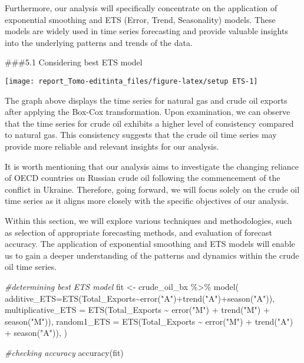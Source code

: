 \documentclass[
]{article}
\newenvironment{Shaded}{\begin{snugshade}}{\end{snugshade}}
\newcommand{\AttributeTok}[1]{\textcolor[rgb]{0.77,0.63,0.00}{#1}}
\newcommand{\CommentTok}[1]{\textcolor[rgb]{0.56,0.35,0.01}{\textit{#1}}}
\newcommand{\FunctionTok}[1]{\textcolor[rgb]{0.00,0.00,0.00}{#1}}
\newcommand{\NormalTok}[1]{#1}
\newcommand{\OtherTok}[1]{\textcolor[rgb]{0.56,0.35,0.01}{#1}}
\newcommand{\SpecialCharTok}[1]{\textcolor[rgb]{0.00,0.00,0.00}{#1}}
\newcommand{\StringTok}[1]{\textcolor[rgb]{0.31,0.60,0.02}{#1}}
\begin{document}
Furthermore, our analysis will specifically concentrate on the
application of exponential smoothing and ETS (Error, Trend, Seasonality)
models. These models are widely used in time series forecasting and
provide valuable insights into the underlying patterns and trends of the
data.

\#\#\#5.1 Considering best ETS model

\begin{center}\texttt{[image: report\_Tomo-editinta\_files/figure-latex/setup ETS-1]} \end{center}

The graph above displays the time series for natural gas and crude oil
exports after applying the Box-Cox transformation. Upon examination, we
can observe that the time series for crude oil exhibits a higher level
of consistency compared to natural gas. This consistency suggests that
the crude oil time series may provide more reliable and relevant
insights for our analysis.

It is worth mentioning that our analysis aims to investigate the
changing reliance of OECD countries on Russian crude oil following the
commencement of the conflict in Ukraine. Therefore, going forward, we
will focus solely on the crude oil time series as it aligns more closely
with the specific objectives of our analysis.

Within this section, we will explore various techniques and
methodologies, such as selection of appropriate forecasting methods, and
evaluation of forecast accuracy. The application of exponential
smoothing and ETS models will enable us to gain a deeper understanding
of the patterns and dynamics within the crude oil time series.

\begin{Shaded}
\begin{Highlighting}[]
\CommentTok{\#determining best ETS model}
\NormalTok{fit }\OtherTok{\textless{}{-}}\NormalTok{ crude\_oil\_bx }\SpecialCharTok{\%\textgreater{}\%} 
  \FunctionTok{model}\NormalTok{(}
    \AttributeTok{additive\_ETS=}\FunctionTok{ETS}\NormalTok{(Total\_Exports}\SpecialCharTok{\textasciitilde{}}\FunctionTok{error}\NormalTok{(}\StringTok{"A"}\NormalTok{)}\SpecialCharTok{+}\FunctionTok{trend}\NormalTok{(}\StringTok{"A"}\NormalTok{)}\SpecialCharTok{+}\FunctionTok{season}\NormalTok{(}\StringTok{"A"}\NormalTok{)),}
    \AttributeTok{multiplicative\_ETS =} \FunctionTok{ETS}\NormalTok{(Total\_Exports }\SpecialCharTok{\textasciitilde{}} \FunctionTok{error}\NormalTok{(}\StringTok{"M"}\NormalTok{) }\SpecialCharTok{+} \FunctionTok{trend}\NormalTok{(}\StringTok{"M"}\NormalTok{) }\SpecialCharTok{+} \FunctionTok{season}\NormalTok{(}\StringTok{"M"}\NormalTok{)),}
    \AttributeTok{random1\_ETS =} \FunctionTok{ETS}\NormalTok{(Total\_Exports }\SpecialCharTok{\textasciitilde{}} \FunctionTok{error}\NormalTok{(}\StringTok{"M"}\NormalTok{) }\SpecialCharTok{+} \FunctionTok{trend}\NormalTok{(}\StringTok{"A"}\NormalTok{) }\SpecialCharTok{+} \FunctionTok{season}\NormalTok{(}\StringTok{"A"}\NormalTok{)),}
\NormalTok{  )}

\CommentTok{\#checking accuracy}
\FunctionTok{accuracy}\NormalTok{(fit) }
\end{Highlighting}
\end{Shaded}
\end{document}
